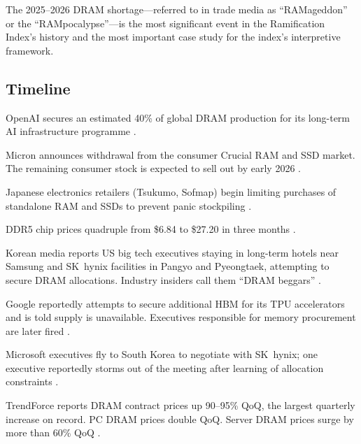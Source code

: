 \documentclass[12pt]{article}
\theoremstyle{definition}
\begin{document}
The 2025--2026 DRAM shortage---referred to in trade media as ``RAMageddon'' or the ``RAMpocalypse''---is the most significant event in the Ramification Index's history and the most important case study for the index's interpretive framework.

\subsection{Timeline}

\begin{description}[itemsep=4pt]
\item[October 2025:] OpenAI secures an estimated 40\% of global DRAM production for its long-term AI infrastructure programme \cite{ColdFusion2026}.

\item[Late 2025:] Micron announces withdrawal from the consumer Crucial RAM and SSD market. The remaining consumer stock is expected to sell out by early 2026 \cite{ColdFusion2026}.

\item[November 2025:] Japanese electronics retailers (Tsukumo, Sofmap) begin limiting purchases of standalone RAM and SSDs to prevent panic stockpiling \cite{IntuitionLabs2025}.

\item[December 2025:] DDR5 chip prices quadruple from \$6.84 to \$27.20 in three months \cite{Sourceability2026}.

\item[January 2026:] Korean media reports US big tech executives staying in long-term hotels near Samsung and SK~hynix facilities in Pangyo and Pyeongtaek, attempting to secure DRAM allocations. Industry insiders call them ``DRAM beggars'' \cite{TrendForce2026Jan}.

\item[January 2026:] Google reportedly attempts to secure additional HBM for its TPU accelerators and is told supply is unavailable. Executives responsible for memory procurement are later fired \cite{ColdFusion2026}.

\item[January 2026:] Microsoft executives fly to South Korea to negotiate with SK~hynix; one executive reportedly storms out of the meeting after learning of allocation constraints \cite{ColdFusion2026}.

\item[Q1 2026:] TrendForce reports DRAM contract prices up 90--95\% QoQ, the largest quarterly increase on record. PC DRAM prices double QoQ. Server DRAM prices surge by more than 60\% QoQ \cite{TrendForce2026Q1Rev}.


\end{description}
\end{document}
